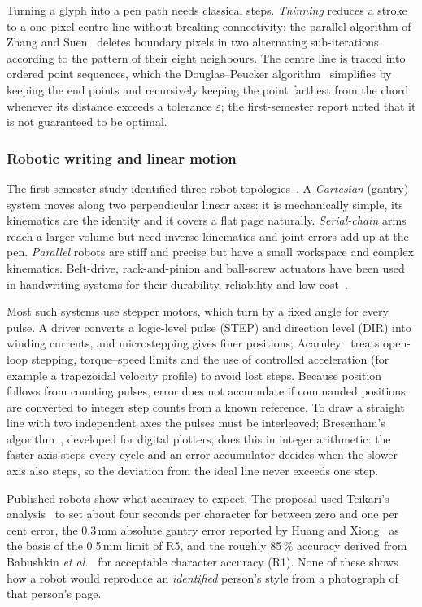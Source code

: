 Turning a glyph into a pen path needs classical steps. \emph{Thinning} reduces a stroke to a one-pixel centre line without breaking connectivity; the parallel algorithm of Zhang and Suen~\cite{zhang1984} deletes boundary pixels in two alternating sub-iterations according to the pattern of their eight neighbours. The centre line is traced into ordered point sequences, which the Douglas--Peucker algorithm~\cite{douglas1973} simplifies by keeping the end points and recursively keeping the point farthest from the chord whenever its distance exceeds a tolerance $\varepsilon$; the first-semester report noted that it is not guaranteed to be optimal.

\subsubsection{Robotic writing and linear motion}
\label{sec:lit-robot}

The first-semester study identified three robot topologies~\cite{teikari2016}. A \emph{Cartesian} (gantry) system moves along two perpendicular linear axes: it is mechanically simple, its kinematics are the identity and it covers a flat page naturally. \emph{Serial-chain} arms reach a larger volume but need inverse kinematics and joint errors add up at the pen. \emph{Parallel} robots are stiff and precise but have a small workspace and complex kinematics. Belt-drive, rack-and-pinion and ball-screw actuators have been used in handwriting systems for their durability, reliability and low cost~\cite{iqs2024}.

Most such systems use stepper motors, which turn by a fixed angle for every pulse. A driver converts a logic-level pulse (STEP) and direction level (DIR) into winding currents, and microstepping gives finer positions; Acarnley~\cite{acarnley2002} treats open-loop stepping, torque--speed limits and the use of controlled acceleration (for example a trapezoidal velocity profile) to avoid lost steps. Because position follows from counting pulses, error does not accumulate if commanded positions are converted to integer step counts from a known reference. To draw a straight line with two independent axes the pulses must be interleaved; Bresenham's algorithm~\cite{bresenham1965}, developed for digital plotters, does this in integer arithmetic: the faster axis steps every cycle and an error accumulator decides when the slower axis also steps, so the deviation from the ideal line never exceeds one step.

Published robots show what accuracy to expect. The proposal used Teikari's analysis~\cite{teikari2016} to set about four seconds per character for between zero and one per cent error, the 0.3\,mm absolute gantry error reported by Huang and Xiong~\cite{huang2024} as the basis of the 0.5\,mm limit of R5, and the roughly 85\,\% accuracy derived from Babushkin \emph{et al.}~\cite{babushkin2025} for acceptable character accuracy (R1). None of these shows how a robot would reproduce an \emph{identified} person's style from a photograph of that person's page.

